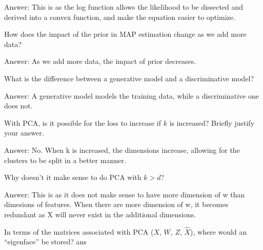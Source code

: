 \documentclass{article}
\def\ans#1{\par\gre{Answer: #1}}
\def\gre#1{{\color{gre}#1}}
\begin{document}
{\ans{This is as the log function allows the likelihood to be dissected and derived into a convex function, and make the equation easier to optimize.}
\item How does the impact of the prior in MAP estimation change as we add more data?
\ans{As we add more data, the impact of prior decreases.}
\item What is the difference between a generative model and a discriminative model?
\ans{A generative model models the training data, while a discriminative one does not.}
\item With PCA, is it possible for the loss to increase if $k$ is increased? Briefly justify your answer.
\ans{No. When k is increased, the dimensions increase, allowing for the clusters to be split in a better manner.}
\item Why doesn't it make sense to do PCA with $k > d$?
\ans{This is as it does not make sense to have more dimension of w than dimesions of features. When there are more dimension of w, it becomes redundant as X will never exist in the additional dimensions.}
\item In terms of the matrices associated with PCA ($X$, $W$, $Z$, $\hat{X}$), where would an ``eigenface'' be stored?
ans{}
}
\end{document}
